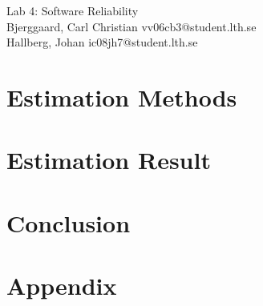 \documentclass[titlepage]{article}
\begin{document}
\begin{center}
	\huge{Lab 4: Software Reliability } \\
	\small{Bjerggaard, Carl Christian vv06cb3@student.lth.se \\Hallberg, Johan ic08jh7@student.lth.se}

\vspace*{1cm}

\end{center}

\thispagestyle{empty}

\clearpage
\section{Estimation Methods}
\label{methods}


\section{Estimation Result}
\label{results}

%
%

\section{Conclusion}
\label{conclusion}

\clearpage
\section*{Appendix}
\label{appendix}

\end{document}

